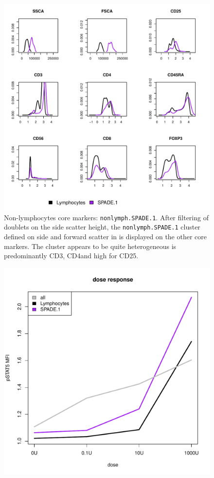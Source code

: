 \begin{figure}
  \centering
\begin{minipage}{.9\textwidth}
\includegraphics[width=\linewidth]{figures/spade-nonlymphocytes-clusters}
{ Non-lymphocytes core markers: \texttt{nonlymph.SPADE.1}.  }
{
    After filtering of doublets on the side scatter height, the \texttt{nonlymph.SPADE.1} cluster defined on side and forward scatter in  is displayed on the other core markers.
    The cluster appears to be quite heterogeneous is predominantly CD3\positive, CD4\positive and high for CD25.
} 
\end{minipage}
%
\begin{minipage}{.5\textwidth}
  \includegraphics[width=\linewidth]{figures/spade-nonlymphocytes-dose-response}

\end{minipage}
\end{figure}
